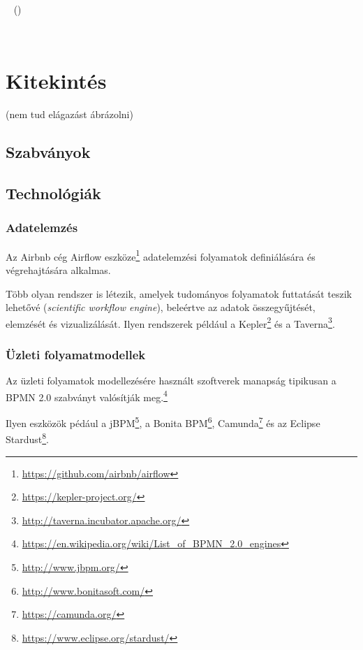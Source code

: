 ~\cite{UML}  ()

~\cite{omg2011bpmn}




\section{Kitekintés\kieg}


 (nem tud elágazást ábrázolni)

\subsection{Szabványok}


\subsection{Technológiák}

\subsubsection{Adatelemzés}

Az Airbnb cég Airflow eszköze\footnote{\url{https://github.com/airbnb/airflow}} adatelemzési folyamatok definiálására és végrehajtására alkalmas.

Több olyan rendszer is létezik, amelyek tudományos folyamatok futtatását teszik lehetővé (\emph{scientific workflow engine}), beleértve az adatok összegyűjtését, elemzését és vizualizálását. Ilyen rendszerek például a
Kepler\footnote{\url{https://kepler-project.org/}} és a Taverna\footnote{\url{http://taverna.incubator.apache.org/}}.

\subsubsection{Üzleti folyamatmodellek}

Az üzleti folyamatok modellezésére használt szoftverek manapság tipikusan a BPMN 2.0 szabványt valósítják meg.\footnote{\url{https://en.wikipedia.org/wiki/List_of_BPMN_2.0_engines}}

Ilyen eszközök pédául a jBPM\footnote{\url{http://www.jbpm.org/}}, a Bonita BPM\footnote{\url{http://www.bonitasoft.com/}}, Camunda\footnote{\url{https://camunda.org/}} és az Eclipse Stardust\footnote{\url{https://www.eclipse.org/stardust/}}.
